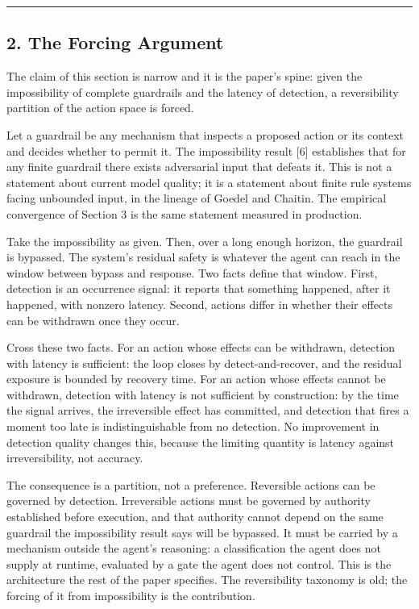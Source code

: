 \documentclass[
  11pt,
]{article}
\begin{document}
\begin{center}\rule{0.5\linewidth}{0.5pt}\end{center}

\subsection{2. The Forcing Argument}\label{the-forcing-argument}

The claim of this section is narrow and it is the paper's spine: given
the impossibility of complete guardrails and the latency of detection, a
reversibility partition of the action space is forced.

Let a guardrail be any mechanism that inspects a proposed action or its
context and decides whether to permit it. The impossibility result
{[}6{]} establishes that for any finite guardrail there exists
adversarial input that defeats it. This is not a statement about current
model quality; it is a statement about finite rule systems facing
unbounded input, in the lineage of Goedel and Chaitin. The empirical
convergence of Section 3 is the same statement measured in production.

Take the impossibility as given. Then, over a long enough horizon, the
guardrail is bypassed. The system's residual safety is whatever the
agent can reach in the window between bypass and response. Two facts
define that window. First, detection is an occurrence signal: it reports
that something happened, after it happened, with nonzero latency.
Second, actions differ in whether their effects can be withdrawn once
they occur.

Cross these two facts. For an action whose effects can be withdrawn,
detection with latency is sufficient: the loop closes by
detect-and-recover, and the residual exposure is bounded by recovery
time. For an action whose effects cannot be withdrawn, detection with
latency is not sufficient by construction: by the time the signal
arrives, the irreversible effect has committed, and detection that fires
a moment too late is indistinguishable from no detection. No improvement
in detection quality changes this, because the limiting quantity is
latency against irreversibility, not accuracy.

The consequence is a partition, not a preference. Reversible actions can
be governed by detection. Irreversible actions must be governed by
authority established before execution, and that authority cannot depend
on the same guardrail the impossibility result says will be bypassed. It
must be carried by a mechanism outside the agent's reasoning: a
classification the agent does not supply at runtime, evaluated by a gate
the agent does not control. This is the architecture the rest of the
paper specifies. The reversibility taxonomy is old; the forcing of it
from impossibility is the contribution.
\end{document}
